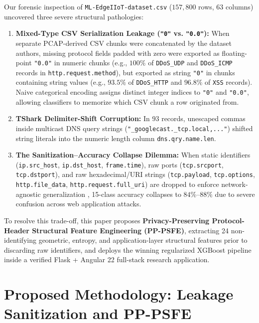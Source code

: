 \documentclass[conference]{IEEEtran}
\begin{document}
Our forensic inspection of \texttt{ML-EdgeIIoT-dataset.csv} ($157,800$ rows, $63$ columns) uncovered three severe structural pathologies:
\begin{enumerate}
    \item \textbf{Mixed-Type CSV Serialization Leakage (\texttt{"0"} vs. \texttt{"0.0"}):} When separate PCAP-derived CSV chunks were concatenated by the dataset authors, missing protocol fields padded with zero were exported as floating-point \texttt{"0.0"} in numeric chunks (e.g., $100\%$ of \texttt{DDoS\_UDP} and \texttt{DDoS\_ICMP} records in \texttt{http.request.method}), but exported as string \texttt{"0"} in chunks containing string values (e.g., $93.5\%$ of \texttt{DDoS\_HTTP} and $96.8\%$ of \texttt{XSS} records). Naive categorical encoding assigns distinct integer indices to \texttt{"0"} and \texttt{"0.0"}, allowing classifiers to memorize which CSV chunk a row originated from.
    \item \textbf{TShark Delimiter-Shift Corruption:} In $93$ records, unescaped commas inside multicast DNS query strings (\texttt{"\_googlecast.\_tcp.local,..."}) shifted string literals into the numeric length column \texttt{dns.qry.name.len}.
    \item \textbf{The Sanitization--Accuracy Collapse Dilemma:} When static identifiers (\texttt{ip.src\_host}, \texttt{ip.dst\_host}, \texttt{frame.time}), raw ports (\texttt{tcp.srcport}, \texttt{tcp.dstport}), and raw hexadecimal/URI strings (\texttt{tcp.payload}, \texttt{tcp.options}, \texttt{http.file\_data}, \texttt{http.request.full\_uri}) are dropped to enforce network-agnostic generalization \cite{lazzarini2023, ullah2024}, 15-class accuracy collapses to $84\%\text{--}88\%$ due to severe confusion across web application attacks.
\end{enumerate}

To resolve this trade-off, this paper proposes \textbf{Privacy-Preserving Protocol-Header Structural Feature Engineering (PP-PSFE)}, extracting 24 non-identifying geometric, entropy, and application-layer structural features prior to discarding raw identifiers, and deploys the winning regularized XGBoost pipeline inside a verified Flask + Angular 22 full-stack research application.

\section{Proposed Methodology: Leakage Sanitization and PP-PSFE}
\end{document}
